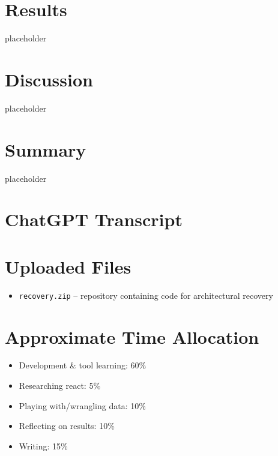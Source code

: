 \documentclass{article}
\begin{document}
\section{Results}

placeholder




\section{Discussion}
placeholder


\section{Summary}
placeholder





\clearpage
\appendix
\section{ChatGPT Transcript}
\label{apx:a}
\begin{figure}[h]

\end{figure}


\clearpage
\section{Uploaded Files}
\label{apx:b}
\begin{itemize}
  \item \verb|recovery.zip| -- repository containing code for architectural recovery
\end{itemize}

\clearpage
\section{Approximate Time Allocation}
\label{apx:c}
\begin{itemize}
  \item Development \& tool learning: 60\%
  \item Researching react: 5\%
  \item Playing with/wrangling data: 10\%
  \item Reflecting on results: 10\%
  \item Writing: 15\%
\end{itemize}
\end{document}
